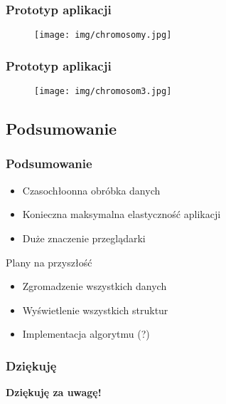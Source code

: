 \documentclass{beamer}
\begin{document}
\begin{frame}\frametitle{Prototyp aplikacji}
	\begin{figure}[htb]
		\begin{center}
	  		\texttt{[image: img/chromosomy.jpg]}
	  	\end{center}
	\end{figure}
\end{frame}


\begin{frame}\frametitle{Prototyp aplikacji}
	\begin{figure}[htb]
		\begin{center}
	  		\texttt{[image: img/chromosom3.jpg]}
	  	\end{center}
	\end{figure}
\end{frame}


\subsection{Podsumowanie}
\begin{frame}\frametitle{Podsumowanie}
	\begin{itemize}
		\item Czasochłoonna obróbka danych
		\item Konieczna maksymalna elastyczność aplikacji
		\item Duże znaczenie przeglądarki
	\end{itemize}
	\begin{block}{Plany na przyszłość}
		\begin{itemize}
			\item Zgromadzenie wszystkich danych
			\item Wyświetlenie wszystkich struktur
			\item Implementacja algorytmu (?)
		\end{itemize}
	\end{block}
\end{frame}


\begin{frame}\frametitle{Dziękuję}
\begin{center}
  \Huge{\textbf{Dziękuję za uwagę!}}
\end{center}
\end{frame}
\end{document}
